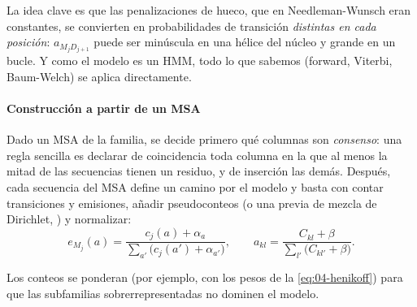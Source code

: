 La idea clave es que las penalizaciones de hueco, que en Needleman-Wunsch eran constantes, se convierten en probabilidades de transición \emph{distintas en cada posición}: $a_{M_jD_{j+1}}$ puede ser minúscula en una hélice del núcleo y grande en un bucle. Y como el modelo es un HMM, todo lo que sabemos (forward, Viterbi, Baum-Welch) se aplica directamente.

\paragraph{Construcción a partir de un MSA} Dado un MSA de la familia, se decide primero qué columnas son \emph{consenso}: una regla sencilla es declarar de coincidencia toda columna en la que al menos la mitad de las secuencias tienen un residuo, y de inserción las demás. Después, cada secuencia del MSA define un camino por el modelo y basta con contar transiciones y emisiones, añadir pseudoconteos (o una previa de mezcla de Dirichlet, \textcite{c04-sjolander1996}) y normalizar:
\begin{equation}\label{eq:04-phmm-est}
e_{M_j}(a) = \frac{c_{j}(a) + \alpha_a}{\sum_{a'}\big(c_{j}(a') + \alpha_{a'}\big)},\qquad
a_{kl} = \frac{C_{kl}+\beta}{\sum_{l'}\big(C_{kl'}+\beta\big)}.
\end{equation}

\begin{simbolos}
\end{simbolos}

\noindent Los conteos se ponderan (por ejemplo, con los pesos de la \cref{eq:04-henikoff}) para que las subfamilias sobrerrepresentadas no dominen el modelo.

